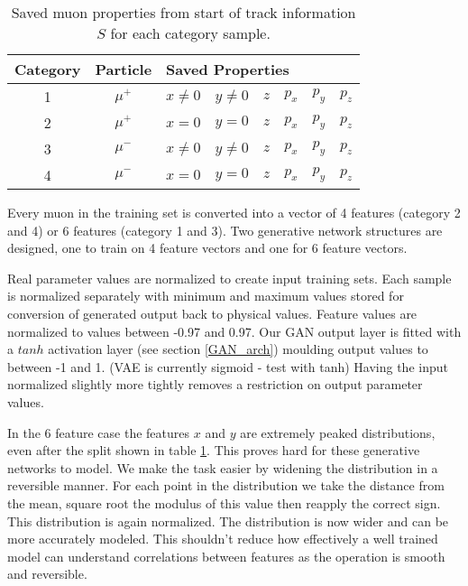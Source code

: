 \documentclass{article}
\begin{document}
        \begin{table}[h!]
        \centering
        \begin{tabular}{|c|c|l|l|l|l|l|l|}
        \hline
         Category &  Particle & \multicolumn{6}{l|}{Saved Properties} \\ \hline
         1 & $\mu^+$ &  \cellcolor{green!25}$x\neq0$ &  \cellcolor{green!25}$y\neq0$ &  \cellcolor{green!25}$z$ &  \cellcolor{green!25}$p_x$ &  \cellcolor{green!25}$p_y$ &  \cellcolor{green!25}$p_z$ \\ \hline
         2 & $\mu^+$ &  \cellcolor{red!25}$x = 0$ &  \cellcolor{red!25}$y = 0$ &  \cellcolor{green!25}$z$ &  \cellcolor{green!25}$p_x$ &  \cellcolor{green!25}$p_y$ &  \cellcolor{green!25}$p_z$ \\ \hline
         3 & $\mu^-$ &  \cellcolor{green!25}$x\neq0$ &  \cellcolor{green!25}$y\neq0$ &  \cellcolor{green!25}$z$ &  \cellcolor{green!25}$p_x$ &  \cellcolor{green!25}$p_y$ &  \cellcolor{green!25}$p_z$ \\ \hline
         4 & $\mu^-$ &  \cellcolor{red!25}$x = 0$ &  \cellcolor{red!25}$y = 0$ &  \cellcolor{green!25}$z$ &  \cellcolor{green!25}$p_x$ &  \cellcolor{green!25}$p_y$ & \cellcolor{green!25}$p_z$  \\ \hline
        \end{tabular}
        \caption {Saved muon properties from start of track information $S$ for each category sample.}\label{save_table}
        \end{table}

        Every muon in the training set is converted into a vector of 4 features (category 2 and 4) or 6 features (category 1 and 3). Two generative network structures are designed, one to train on 4 feature vectors and one for 6 feature vectors.

        Real parameter values are normalized to create input training sets. Each sample is normalized separately with minimum and maximum values stored for conversion of generated output back to physical values. Feature values are normalized to values between -0.97 and 0.97. Our GAN output layer is fitted with a $tanh$ activation layer (see section \ref{GAN_arch}) moulding output values to between -1 and 1. (VAE is currently sigmoid - test with tanh) Having the input normalized slightly more tightly removes a restriction on output parameter values. 
        
        In the 6 feature case the features $x$ and $y$ are extremely peaked distributions, even after the split shown in table \ref{save_table}. This proves hard for these generative networks to model. We make the task easier by widening the distribution in a reversible manner. For each point in the distribution we take the distance from the mean, square root the modulus of this value then reapply the correct sign. This distribution is again normalized. The distribution is now wider and can be more accurately modeled. This shouldn't reduce how effectively a well trained model can understand correlations between features as the operation is smooth and reversible. 
\end{document}
